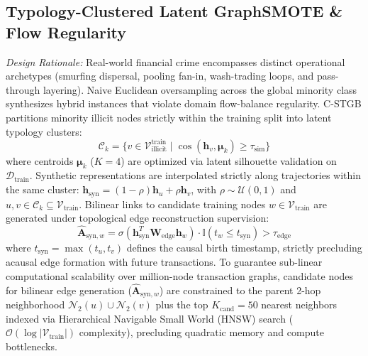 \subsection{Typology-Clustered Latent GraphSMOTE \& Flow Regularity}
\label{sec:graph_smote}
\textit{Design Rationale:} Real-world financial crime encompasses distinct operational archetypes (smurfing dispersal, pooling fan-in, wash-trading loops, and pass-through layering). Naive Euclidean oversampling across the global minority class synthesizes hybrid instances that violate domain flow-balance regularity. C-STGB partitions minority illicit nodes strictly within the training split into latent typology clusters:
\begin{equation}
\mathcal{C}_k = \{ v \in \mathcal{V}_{\text{illicit}}^{\text{train}} \mid \cos(\mathbf{h}_v, \boldsymbol{\mu}_k) \ge \tau_{\text{sim}} \}
\end{equation}
where centroids $\boldsymbol{\mu}_k$ ($K=4$) are optimized via latent silhouette validation on $\mathcal{D}_{\text{train}}$. Synthetic representations are interpolated strictly along trajectories within the same cluster: $\mathbf{h}_{\text{syn}} = (1 - \rho) \mathbf{h}_u + \rho \mathbf{h}_v$, with $\rho \sim \mathcal{U}(0, 1)$ and $u, v \in \mathcal{C}_k \subseteq \mathcal{V}_{\text{train}}$. Bilinear links to candidate training nodes $w \in \mathcal{V}_{\text{train}}$ are generated under topological edge reconstruction supervision:
\begin{equation}
\hat{\mathbf{A}}_{\text{syn}, w} = \sigma\left( \mathbf{h}_{\text{syn}}^T \mathbf{W}_{\text{edge}} \mathbf{h}_w \right) \cdot \mathbb{I}(t_w \le t_{\text{syn}}) > \tau_{\text{edge}}
\end{equation}
where $t_{\text{syn}} = \max(t_u, t_v)$ defines the causal birth timestamp, strictly precluding acausal edge formation with future transactions. To guarantee sub-linear computational scalability over million-node transaction graphs, candidate nodes for bilinear edge generation ($\hat{\mathbf{A}}_{\text{syn}, w}$) are constrained to the parent 2-hop neighborhood $\mathcal{N}_2(u) \cup \mathcal{N}_2(v)$ plus the top $K_{\text{cand}}=50$ nearest neighbors indexed via Hierarchical Navigable Small World (HNSW) search ($\mathcal{O}(\log |\mathcal{V}_{\text{train}}|)$ complexity), precluding quadratic memory and compute bottlenecks.

